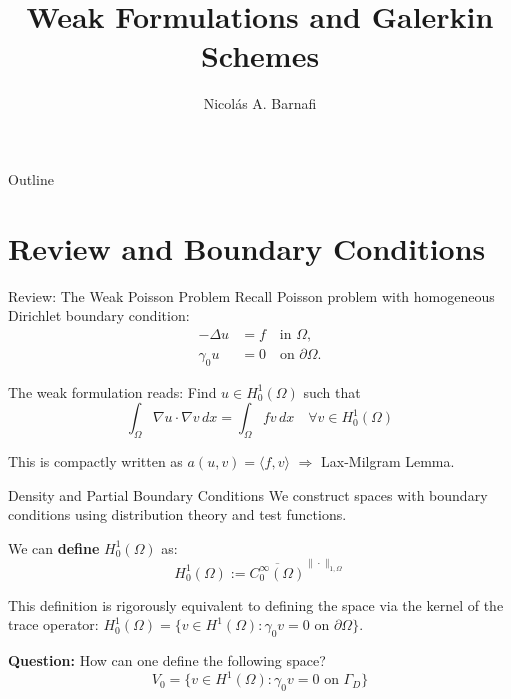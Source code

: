 \documentclass[aspectratio=169]{beamer}
\title[Weak Formulations \& Lax-Milgram]{Weak Formulations and Galerkin Schemes}
\author{Nicol\'as A. Barnafi}
\date{}
\begin{document}
\begin{frame}
    \titlepage
\end{frame}

\begin{frame}{Outline}
    \tableofcontents
\end{frame}

\section{Review and Boundary Conditions}

\begin{frame}{Review: The Weak Poisson Problem}
    Recall Poisson problem with homogeneous Dirichlet boundary condition:
    \begin{align*}
        -\Delta u &= f \quad \text{in } \Omega, \\
        \gamma_0 u &= 0 \quad \text{on } \partial\Omega.
    \end{align*}
    
    The weak formulation reads: Find $u \in H^1_0(\Omega)$ such that
    $$ \int_\Omega \nabla u \cdot \nabla v \, dx = \int_\Omega f v \, dx \quad \forall v \in H^1_0(\Omega) $$
    
    This is compactly written as $a(u,v) = \langle f, v \rangle$ $\Rightarrow$ Lax-Milgram Lemma.
\end{frame}

\begin{frame}{Density and Partial Boundary Conditions}
    We construct spaces with boundary conditions using distribution theory and test functions. 
    
    \vspace{0.2cm}
    We can \textbf{define} $H^1_0(\Omega)$ as:
    $$ H^1_0(\Omega) := \overline{C_0^\infty(\Omega)}^{\|\cdot\|_{1,\Omega}} $$

    This definition is rigorously equivalent to defining the space via the kernel of the trace operator: $H^1_0(\Omega) = \{v \in H^1(\Omega) : \gamma_0 v = 0 \text{ on } \partial\Omega\}$.


    \vspace{0.3cm}
    \textbf{Question:} How can one define the following space?
    $$ V_0 = \{ v \in H^1(\Omega) : \gamma_0 v = 0 \text{ on } \Gamma_D \} $$
\end{frame}
\end{document}
